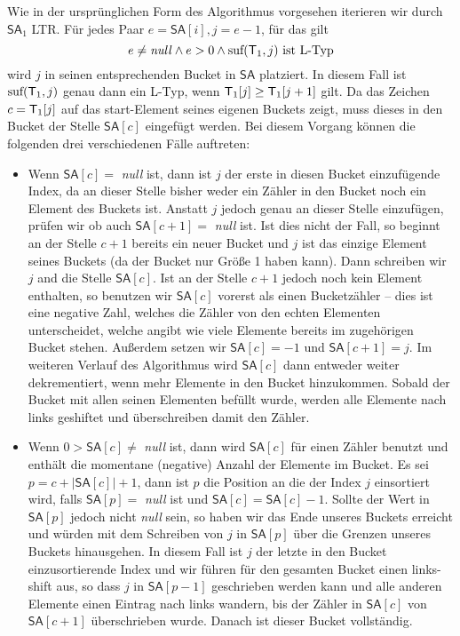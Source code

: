 Wie in der ursprünglichen Form des Algorithmus vorgesehen iterieren wir durch $\mathsf{SA}_1$ LTR. Für jedes Paar $e = \mathsf{SA}[i], j = e -1$, für das gilt
\[
	e \neq \text{\textit{null}} \wedge e > 0  \wedge \suf(\inputtext_1,j) \text{ ist L-Typ} 
\]
wird $j$ in seinen entsprechenden Bucket in $\mathsf{SA}$ platziert. In diesem Fall ist $\suf(\inputtext_1,j)$ genau dann ein L-Typ, wenn $\inputtext_1[j] \geq \inputtext_1[j+1]$ gilt. Da das Zeichen $c = \inputtext_1[j]$ auf das start-Element seines eigenen Buckets zeigt, muss dieses in den Bucket der Stelle $\mathsf{SA}[c]$ eingefügt werden. Bei diesem Vorgang können die folgenden drei verschiedenen Fälle auftreten:

\begin{itemize}
\item Wenn $\mathsf{SA}[c] = $ \textit{null} ist, dann ist $j$ der erste in diesen Bucket einzufügende Index, da an dieser Stelle bisher weder ein Zähler in den Bucket noch ein Element des Buckets ist. Anstatt $j$ jedoch genau an dieser Stelle einzufügen, prüfen wir ob auch $\mathsf{SA}[c+1]  = $ \textit{null} ist. Ist dies nicht der Fall, so beginnt an der Stelle $c+1$ bereits ein neuer Bucket und $j$ ist das einzige Element seines Buckets (da der Bucket nur Größe 1 haben kann). Dann schreiben wir $j$ and die Stelle $\mathsf{SA}[c]$. Ist an der Stelle $c+1$ jedoch noch kein Element enthalten, so benutzen wir $\mathsf{SA}[c]$ vorerst als einen Bucketzähler -- dies ist eine negative Zahl, welches die Zähler von den echten Elementen unterscheidet, welche angibt wie viele Elemente bereits im zugehörigen Bucket stehen. Außerdem setzen wir $\mathsf{SA}[c] = -1$ und $\mathsf{SA}[c+1] = j$. Im weiteren Verlauf des Algorithmus wird $\mathsf{SA}[c]$ dann entweder weiter dekrementiert, wenn mehr Elemente in den Bucket hinzukommen. Sobald der Bucket mit allen seinen Elementen befüllt wurde, werden alle Elemente nach links geshiftet und überschreiben damit den Zähler.

\item Wenn $ 0 > \mathsf{SA}[c] \neq$ \textit{null} ist, dann wird $\mathsf{SA}[c]$ für einen Zähler benutzt und enthält die momentane (negative) Anzahl der Elemente im Bucket. Es sei $p = c + |\mathsf{SA}[c]| + 1$, dann ist $p$ die Position an die der Index $j$ einsortiert wird, falls $\mathsf{SA}[p] = $ \textit{null} ist und $\mathsf{SA}[c] = \mathsf{SA}[c] - 1$. Sollte der Wert in $\mathsf{SA}[p]$ jedoch nicht \textit{null} sein, so haben wir das Ende unseres Buckets erreicht und würden mit dem Schreiben von $j$ in $\mathsf{SA}[p]$ über die Grenzen unseres Buckets hinausgehen. In diesem Fall ist $j$ der letzte in den Bucket einzusortierende Index und wir führen für den gesamten Bucket einen links-shift aus, so dass $j$ in $\mathsf{SA}[p-1]$ geschrieben werden kann und alle anderen Elemente einen Eintrag nach links wandern, bis der Zähler in $\mathsf{SA}[c]$ von $\mathsf{SA}[c+1]$ überschrieben wurde. Danach ist dieser Bucket vollständig.


\end{itemize}
